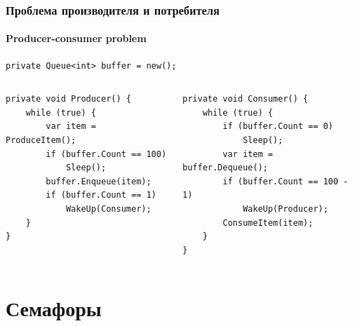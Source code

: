 \documentclass{../../slides-style}
\begin{document}
    \begin{frame}[fragile]
        \frametitle{Проблема производителя и потребителя}
        \framesubtitle{Producer-consumer problem}
        \begin{footnotesize}
            \begin{verbatim}
private Queue<int> buffer = new();
            \end{verbatim}
            \begin{columns}
                \begin{column}{0.5\textwidth}
                    \begin{verbatim}
private void Producer() {
    while (true) {
        var item = ProduceItem();
        if (buffer.Count == 100)
            Sleep();
        buffer.Enqueue(item);
        if (buffer.Count == 1)
            WakeUp(Consumer);
    }
}
                    \end{verbatim}
                \end{column}
                \begin{column}{0.5\textwidth}
                    \begin{verbatim}
private void Consumer() {
    while (true) {
        if (buffer.Count == 0)
            Sleep();
        var item = buffer.Dequeue();
        if (buffer.Count == 100 - 1)
            WakeUp(Producer);
        ConsumeItem(item);
    }
}
                    \end{verbatim}
                \end{column}
            \end{columns}
        \end{footnotesize}
    \end{frame}

    \section{Семафоры}
\end{document}

